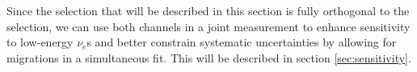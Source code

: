 Since the \zpsel selection that will be described in this section is fully orthogonal to the \npsel selection, we can use both channels in a joint measurement to enhance sensitivity to low-energy $\nu_e$s and better constrain systematic uncertainties by allowing for migrations in a simultaneous fit. This will be described in section \ref{sec:sensitivity}. 






